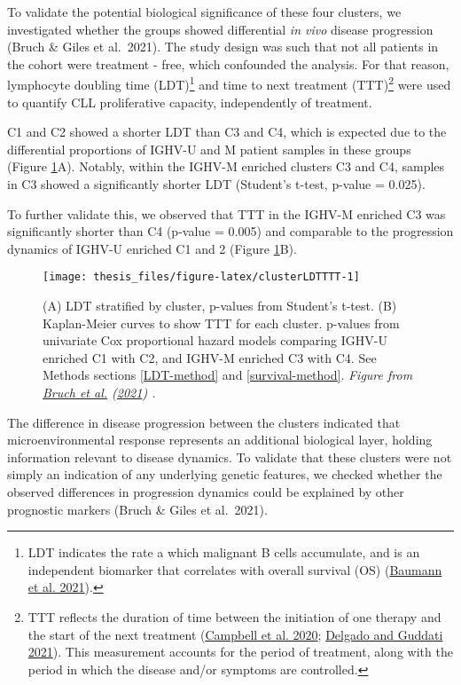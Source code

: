 \documentclass[11pt, a4paper, twosided]{book}
\begin{document}
To validate the potential biological significance of these four clusters, we investigated whether the groups showed differential \emph{in vivo} disease progression (Bruch \& Giles et al.~2021). The study design was such that not all patients in the cohort were treatment - free, which confounded the analysis. For that reason, lymphocyte doubling time (LDT)\footnote{LDT indicates the rate a which malignant B cells accumulate, and is an independent biomarker that correlates with overall survival (OS) (\protect\hyperlink{ref-Baumann2021}{Baumann et al. 2021}).} and time to next treatment (TTT)\footnote{TTT reflects the duration of time between the initiation of one therapy and the start of the next treatment (\protect\hyperlink{ref-Campbell2020}{Campbell et al. 2020}; \protect\hyperlink{ref-Delgado2021}{Delgado and Guddati 2021}). This measurement accounts for the period of treatment, along with the period in which the disease and/or symptoms are controlled.} were used to quantify CLL proliferative capacity, independently of treatment.

C1 and C2 showed a shorter LDT than C3 and C4, which is expected due to the differential proportions of IGHV-U and M patient samples in these groups (Figure \ref{fig:clusterLDTTTT}A). Notably, within the IGHV-M enriched clusters C3 and C4, samples in C3 showed a significantly shorter LDT (Student's t-test, p-value = 0.025).

To further validate this, we observed that TTT in the IGHV-M enriched C3 was significantly shorter than C4 (p-value = 0.005) and comparable to the progression dynamics of IGHV-U enriched C1 and 2 (Figure \ref{fig:clusterLDTTTT}B).


\begin{figure}

{\centering \texttt{[image: thesis\_files/figure-latex/clusterLDTTTT-1]} 

}

\caption{(A) LDT stratified by cluster, p-values from Student's t-test. (B) Kaplan-Meier curves to show TTT for each cluster. p-values from univariate Cox proportional hazard models comparing IGHV-U enriched C1 with C2, and IGHV-M enriched C3 with C4. See Methods sections \ref{LDT-method} and \ref{survival-method}. \emph{Figure from \protect\hyperlink{ref-Giles2021}{Bruch et al.} (\protect\hyperlink{ref-Giles2021}{2021}) .}}\label{fig:clusterLDTTTT}
\end{figure}
The difference in disease progression between the clusters indicated that microenvironmental response represents an additional biological layer, holding information relevant to disease dynamics. To validate that these clusters were not simply an indication of any underlying genetic features, we checked whether the observed differences in progression dynamics could be explained by other prognostic markers (Bruch \& Giles et al.~2021).
\end{document}
